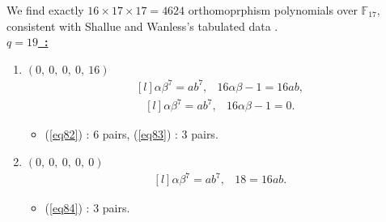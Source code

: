 \documentclass[12pt,a4wide, reqno]{amsart}
\theoremstyle{definition}
\theoremstyle{remark}
\numberwithin{equation}{section}
\begin{document}
We find exactly $16\times 17 \times 17=4624$ orthomoprphism polynomials over $\mathbb{F}_{17},$ consistent with Shallue and Wanless's tabulated data \cite[Table~3.2]{shallue}.
 \vspace{0.5 cm}\\
\underline{\Large \textbf{$q=19$~:}}
\vspace{0.2cm}
\begin{enumerate}[label=\textbf{(\arabic*)}]
    \item 
    $(0,~0,~0,~0,~16)$ 
\begin{equation}\label{eq82}
    \begin{matrix*}[l]
         \alpha \beta ^7=ab^7, & 16\alpha\beta-1=16ab,
    \end{matrix*}
\end{equation}
\begin{equation}\label{eq83}
    \begin{matrix*}[l]
         \alpha \beta ^7=ab^7, & 16\alpha\beta-1=0.
    \end{matrix*}
\end{equation}
\begin{itemize}
    \item 
    (\ref{eq82}) : $6$ pairs, (\ref{eq83}) : $3$ pairs.
    \end{itemize}
    \item 
    $(0,~0,~0,~0,~0)$ 
\begin{equation}\label{eq84}
    \begin{matrix*}[l]
         \alpha \beta ^7=ab^7, & 18=16ab.
    \end{matrix*}
\end{equation}
\begin{itemize}
    \item 
    (\ref{eq84}) : $3$ pairs.
    \end{itemize}
\end{enumerate}
\end{document}
